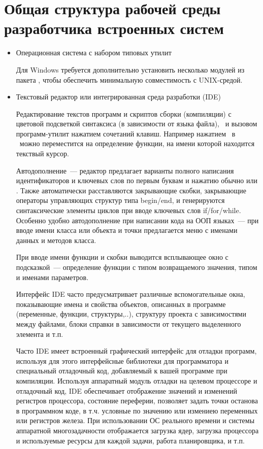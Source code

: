 



\section{Общая структура рабочей среды разработчика встроенных систем}

\begin{itemize}
  \item Операционная система с набором типовых утилит
  
  Для Windows требуется дополнительно установить несколько модулей из пакета
  , чтобы обеспечить минимальную совместимость с UNIX-средой.
  
  \item Текстовый редактор или интегрированная среда разработки (IDE)
  
  Редактирование текстов программ и скриптов сборки (компиляции) с
  цветовой подсветкой синтаксиса (в зависимости от языка файла),
  \ и вызовом программ-утилит нажатием сочетаний 
  клавиш. Например нажатием \ в \eclipse\ можно переместится на
  определение функции, на имени которой находится текствый курсор.
  
  Автодополнение\ --- редактор предлагает варианты полного написания
  идентификаторов и ключевых слов по первым буквам и нажатию обычно
   или . Также автоматически расставляются
  закрывающие скобки, закрывающие операторы управляющих структур типа begin/end,
  и генерируются синтаксические элементы циклов при вводе ключевых слов
  if/for/while. Особенно удобно автодополнение при написании кода на ООП 
  языках\  --- при вводе имени класса или объекта и точки предлагается меню с
  именами данных и методов класса. 
  
  При вводе имени функции и скобки выводится всплывающее окно с подсказкой\ ---
  определение функции с типом возвращаемого значения, типом и именами
  параметров.
  
  Интерфейс IDE часто предусматривает различные вспомогательные окна,
  показывающие имена и свойства объектов, описанных в программе (переменные,
  функции, структуры,..), структуру проекта с зависимостями между файлами, блоки
  справки в зависимости от текущего выделенного элемента и т.п.
  
  Часто IDE имеет встроенный графический интерфейс для отладки программ,
  используя для этого интерфейсные библиотеки для программатора и
  специальный отладочный код, добавляемый к вашей программе при
  компиляции. Используя аппаратный модуль отладки на целевом процессоре и
  отладочный код, IDE обеспечивает отображение значений и изменений регистров
  процессора, состояние переферии, позволяет задать точки останова в программном
  коде, в т.ч. условные по значению или измениею переменных или регистров
  железа.
  При использовании ОС реального времени и системы аппаратной многозадачности
  отображается загрузка ядер, загрузка процессора и используемые ресурсы для
  каждой задачи, работа планировщика, и т.п.
  

\end{itemize}
